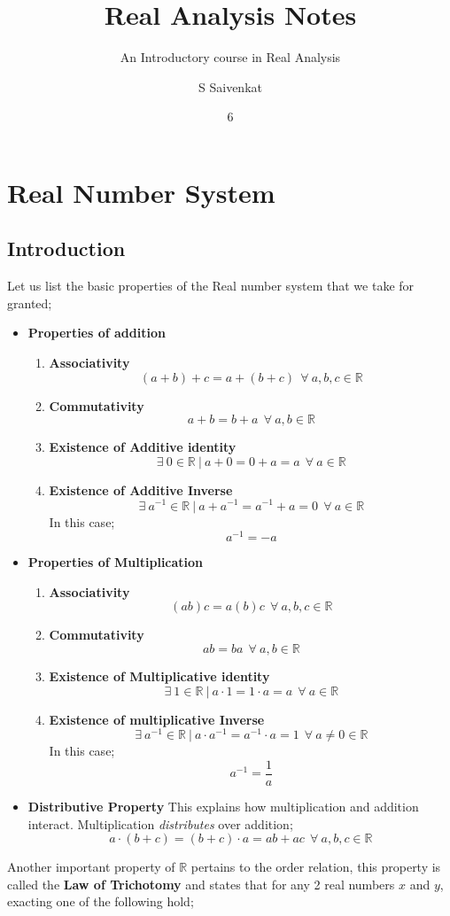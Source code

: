 \documentclass[english,course]{lecture}
\title{Real Analysis Notes}
\subtitle{An Introductory course in Real Analysis}
\author{S Saivenkat}
\date{6}{17}{2022}
\begin{document}
\section{Real Number System}
\subsection{Introduction}
Let us list the basic properties of the Real number system that we take for granted;
\begin{itemize}
\item \textbf{Properties of addition}
\begin{enumerate}
\item \textbf{Associativity}
$$ (a+b)+c =a+(b+c) \ \ \forall \ a,b,c \in \mathbb{R}$$
\item \textbf{Commutativity}
$$ a+b =b+a \ \ \forall \ a,b \in \mathbb{R}$$
\item \textbf{Existence of Additive identity}
$$ \exists \ 0 \in \mathbb{R} \ | \ a+0 =0+a =a  \ \ \forall \ a \in \mathbb{R}$$
\item \textbf{Existence of Additive Inverse}
$$ \exists \ a^{-1} \in \mathbb{R} \ | \ a+a^{-1} =a^{-1}+a =0  \ \ \forall \ a \in \mathbb{R}$$
In this case;
$$ a^{-1} = -a$$
\end{enumerate}
\item \textbf{Properties of Multiplication}
\begin{enumerate}
\item \textbf{Associativity}
$$ (ab)c =a(b)c \ \ \forall \ a,b,c \in \mathbb{R}$$
\item \textbf{Commutativity}
$$ ab =ba \ \ \forall \ a,b \in \mathbb{R}$$
\item \textbf{Existence of Multiplicative identity}
$$ \exists \ 1 \in \mathbb{R} \ | \ a \cdot 1 =1 \cdot a =a  \ \ \forall \ a \in \mathbb{R}$$
\item \textbf{Existence of multiplicative Inverse}
$$ \exists \ a^{-1} \in \mathbb{R} \ | \ a \cdot a^{-1} =a^{-1} \cdot a =1  \ \ \forall \ a \neq 0 \in \mathbb{R}$$
In this case;
$$ a^{-1} = \frac{1}{a}$$
\end{enumerate}
\item \textbf{Distributive Property}
This explains how multiplication and addition interact. Multiplication \textit{distributes} over addition;
$$ a \cdot (b+c)=(b+c) \cdot a = ab+ac \ \ \forall \ a,b,c \in \mathbb{R}$$
\end{itemize}
Another important property of $\mathbb{R}$ pertains to the order relation, this property is called the \textbf{Law of Trichotomy} and states that for any 2 real numbers $x$ and $y$, exacting one of the following hold;
\end{document}

